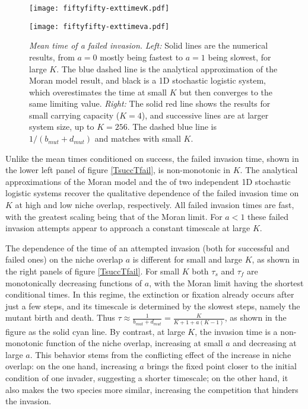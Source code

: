 \begin{figure}[h]
	\centering
	\begin{minipage}{0.49\linewidth}
		\centering
		\texttt{[image: fiftyfifty-exttimevK.pdf]}
	\end{minipage}
	\begin{minipage}{0.49\linewidth}
		\centering
		\texttt{[image: fiftyfifty-exttimeva.pdf]}
	\end{minipage}
	\caption{\emph{Mean time of a failed invasion.}
		\emph{Left:} Solid lines are the numerical results, from $a=0$ mostly being fastest to $a=1$ being slowest, for large $K$. The blue dashed line is the analytical approximation of the Moran model result, and black is a 1D stochastic logistic system, which overestimates the time at small $K$ but then converges to the same limiting value.
		\emph{Right:} The solid red line shows the results for small carrying capacity ($K=4$), and successive lines are at larger system size, up to $K=256$. The dashed blue line is $1/(b_{mut}+d_{mut})$ and matches with small $K$.
	} \label{Tfail}
\end{figure}
\fi

Unlike the mean times conditioned on success, the failed invasion time, shown in the lower left panel of figure \ref{TsuccTfail}, is non-monotonic in $K$. 
The analytical approximations of the Moran model and the of two independent 1D stochastic logistic systems recover the qualitative dependence of the failed invasion time on $K$ at high and low niche overlap, respectively. 
All failed invasion times are fast, with the greatest scaling being that of the Moran limit. 
For $a<1$ these failed invasion attempts appear to approach a constant timescale at large $K$.

The dependence of the time of an attempted invasion (both for successful and failed ones) on the niche overlap $a$ is different for small and large $K$, as shown in the right panels of figure \ref{TsuccTfail}. 
For small $K$ both $\tau_s$ and $\tau_f$ are monotonically decreasing functions of $a$, with the Moran limit having the shortest conditional times. 
In this regime, the extinction or fixation already occurs after just a few steps, and its timescale is determined by the slowest steps, namely the mutant birth and death. 
Thus $\tau \approx \frac{1}{b_{mut}+d_{mut}}=\frac{K}{K+1+a(K-1)}$, as shown in the figure as the solid cyan line. 
By contrast, at large $K$, the invasion time is a non-monotonic function of the niche overlap, increasing at small $a$ and decreasing at large $a$. 
This behavior stems from the conflicting effect of the increase in niche overlap: on the one hand, increasing $a$ brings the fixed point closer to the initial condition of one invader, suggesting a shorter timescale; on the other hand, it also makes the two species more similar, increasing the competition that hinders the invasion.


